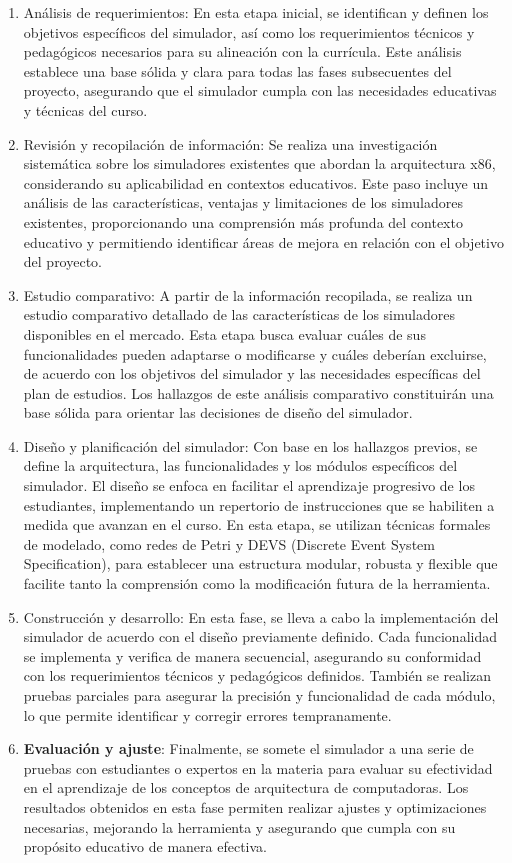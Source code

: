 \documentclass[12pt,oneside]{templates/unerthesis}
\begin{document}
\begin{enumerate}
\def\labelenumi{\arabic{enumi}.}
\item
  Análisis de requerimientos: En esta etapa inicial, se identifican y definen los objetivos específicos del simulador, así como los requerimientos técnicos y pedagógicos necesarios para su alineación con la currícula. Este análisis establece una base sólida y clara para todas las fases subsecuentes del proyecto, asegurando que el simulador cumpla con las necesidades educativas y técnicas del curso.
\item
  Revisión y recopilación de información: Se realiza una investigación sistemática sobre los simuladores existentes que abordan la arquitectura x86, considerando su aplicabilidad en contextos educativos. Este paso incluye un análisis de las características, ventajas y limitaciones de los simuladores existentes, proporcionando una comprensión más profunda del contexto educativo y permitiendo identificar áreas de mejora en relación con el objetivo del proyecto.
\item
  Estudio comparativo: A partir de la información recopilada, se realiza un estudio comparativo detallado de las características de los simuladores disponibles en el mercado. Esta etapa busca evaluar cuáles de sus funcionalidades pueden adaptarse o modificarse y cuáles deberían excluirse, de acuerdo con los objetivos del simulador y las necesidades específicas del plan de estudios. Los hallazgos de este análisis comparativo constituirán una base sólida para orientar las decisiones de diseño del simulador.
\item
  Diseño y planificación del simulador: Con base en los hallazgos previos, se define la arquitectura, las funcionalidades y los módulos específicos del simulador. El diseño se enfoca en facilitar el aprendizaje progresivo de los estudiantes, implementando un repertorio de instrucciones que se habiliten a medida que avanzan en el curso. En esta etapa, se utilizan técnicas formales de modelado, como redes de Petri y DEVS (Discrete Event System Specification), para establecer una estructura modular, robusta y flexible que facilite tanto la comprensión como la modificación futura de la herramienta.
\item
  Construcción y desarrollo: En esta fase, se lleva a cabo la implementación del simulador de acuerdo con el diseño previamente definido. Cada funcionalidad se implementa y verifica de manera secuencial, asegurando su conformidad con los requerimientos técnicos y pedagógicos definidos. También se realizan pruebas parciales para asegurar la precisión y funcionalidad de cada módulo, lo que permite identificar y corregir errores tempranamente.
\item
  \textbf{Evaluación y ajuste}: Finalmente, se somete el simulador a una serie de pruebas con estudiantes o expertos en la materia para evaluar su efectividad en el aprendizaje de los conceptos de arquitectura de computadoras. Los resultados obtenidos en esta fase permiten realizar ajustes y optimizaciones necesarias, mejorando la herramienta y asegurando que cumpla con su propósito educativo de manera efectiva.
\end{enumerate}
\end{document}
